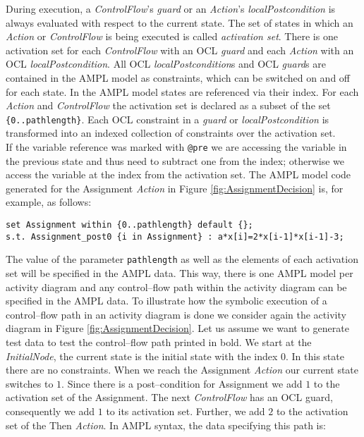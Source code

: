 \documentclass[runningheads,a4paper]{llncs}%
\newcommand{\UMLType}[1]{\textsf{\textit{#1}}} %
\newcommand{\UMLReference}[1]{\textsf{\textit{#1}}} %
\newcommand{\AMPLCode}[1]{\texttt{#1}}
\begin{document}
During execution, a \UMLType{ControlFlow}'s \UMLReference{guard} or an \UMLType{Action}'s \UMLReference{localPostcondition} is always evaluated with respect to the current state. The set of states in which an \UMLType{Action} or \UMLType{ControlFlow} is being executed is called \emph{activation set}. There is one activation set for each \UMLType{ControlFlow} with an OCL \UMLReference{guard} and each \UMLType{Action} with an OCL \UMLReference{localPostcondition}. All OCL \UMLReference{localPostcondition}s and OCL \UMLReference{guard}s are contained in the AMPL model as constraints, which can be switched on and off for each state. In the AMPL model states are referenced via their index. For each \UMLType{Action} and \UMLType{ControlFlow} the activation set is declared as a subset of the set \AMPLCode{\{0..pathlength\}}. Each OCL constraint in a \UMLReference{guard} or \UMLReference{localPostcondition} is transformed into an indexed collection of constraints over the activation set.\\
If the variable reference was marked with \verb=@pre= we are accessing the variable in the previous state and thus need to subtract one from the index; otherwise we access the variable at the index from the activation set. The AMPL model code generated for the Assignment \UMLType{Action} in Figure \ref{fig:AssignmentDecision} is, for example, as follows:%
\begin{lstlisting}[basicstyle=\ttfamily,language=ampl,breaklines=true]
set Assignment within {0..pathlength} default {};
s.t. Assignment_post0 {i in Assignment} : a*x[i]=2*x[i-1]*x[i-1]-3;
\end{lstlisting}
The value of the parameter \AMPLCode{pathlength} as well as the elements of each activation set will be specified in the AMPL data. This way, there is one AMPL model per activity diagram and any control--flow path within the activity diagram can be specified in the AMPL data. To illustrate how the symbolic execution of a control--flow path in an activity diagram is done we consider again the activity diagram in Figure \ref{fig:AssignmentDecision}. Let us assume we want to generate test data to test the control--flow path printed in bold. We start at the \UMLType{InitialNode}, the current state is the initial state with the index $0$. In this state there are no constraints. When we reach the Assignment \UMLType{Action} our current state switches to $1$. Since there is a post--condition for Assignment we add $1$ to the activation set of the Assignment. The next \UMLType{ControlFlow} has an OCL guard, consequently we add $1$ to its activation set. Further, we add $2$ to the activation set of the Then \UMLType{Action}. In AMPL syntax, the data specifying this path is:%
\end{document}
